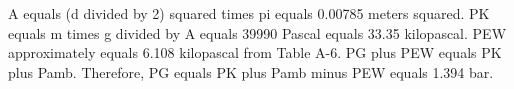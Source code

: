 A equals (d divided by 2) squared times pi equals 0.00785 meters squared.  
PK equals m times g divided by A equals 39990 Pascal equals 33.35 kilopascal.  
PEW approximately equals 6.108 kilopascal from Table A-6.  
PG plus PEW equals PK plus Pamb.  
Therefore, PG equals PK plus Pamb minus PEW equals 1.394 bar.